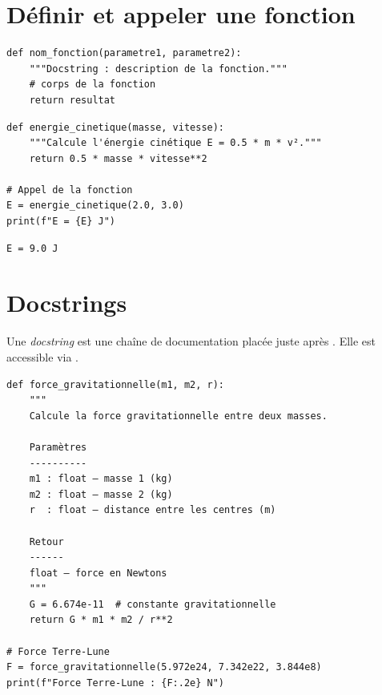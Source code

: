 \section{D\'efinir et appeler une fonction}

\begin{definition}
\begin{verbatim}
def nom_fonction(parametre1, parametre2):
    """Docstring : description de la fonction."""
    # corps de la fonction
    return resultat
\end{verbatim}
\end{definition}

\begin{codeblock}[title=\textbf{Python}]
\begin{verbatim}
def energie_cinetique(masse, vitesse):
    """Calcule l'énergie cinétique E = 0.5 * m * v²."""
    return 0.5 * masse * vitesse**2

# Appel de la fonction
E = energie_cinetique(2.0, 3.0)
print(f"E = {E} J")
\end{verbatim}
\end{codeblock}

\begin{codeoutput}
\begin{verbatim}
E = 9.0 J
\end{verbatim}
\end{codeoutput}

\section{Docstrings}

Une \emph{docstring} est une cha\^ine de documentation plac\'ee juste apr\`es .
Elle est accessible via .

\begin{codeblock}[title=\textbf{Python}]
\begin{verbatim}
def force_gravitationnelle(m1, m2, r):
    """
    Calcule la force gravitationnelle entre deux masses.

    Paramètres
    ----------
    m1 : float — masse 1 (kg)
    m2 : float — masse 2 (kg)
    r  : float — distance entre les centres (m)

    Retour
    ------
    float — force en Newtons
    """
    G = 6.674e-11  # constante gravitationnelle
    return G * m1 * m2 / r**2

# Force Terre-Lune
F = force_gravitationnelle(5.972e24, 7.342e22, 3.844e8)
print(f"Force Terre-Lune : {F:.2e} N")
\end{verbatim}
\end{codeblock}

